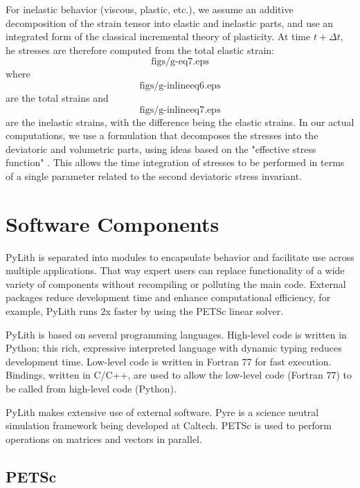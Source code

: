For inelastic behavior (viscous, plastic, etc.), we assume an additive
decomposition of the strain tensor into elastic and inelastic parts,
and use an integrated form of the classical incremental theory of
plasticity. At time $t+\Delta t$, he stresses are therefore computed
from the total elastic strain:
\begin{equation}
  \text{figs/g-eq7.eps}
\end{equation}
where
\begin{equation}
  \text{figs/g-inlineeq6.eps}
\end{equation}
are the total strains and
\begin{equation}
  \text{figs/g-inlineeq7.eps}
\end{equation}
are the inelastic strains, with the difference being the elastic
strains. In our actual computations, we use a formulation that
decomposes the stresses into the deviatoric and volumetric parts,
using ideas based on the "effective stress function"
\cite{Kojic:Bathe:1987}. This allows the time integration of stresses
to be performed in terms of a single parameter related to the second
deviatoric stress invariant.

\section{Software Components}

PyLith is separated into modules to encapsulate behavior and
facilitate use across multiple applications. That way expert users can
replace functionality of a wide variety of components without
recompiling or polluting the main code. External packages reduce
development time and enhance computational efficiency, for example,
PyLith runs 2x faster by using the PETSc linear solver.

PyLith is based on several programming languages. High-level code is
written in Python; this rich, expressive interpreted language with
dynamic typing reduces development time. Low-level code is written in
Fortran 77 for fast execution. Bindings, written in C/C++, are used to
allow the low-level code (Fortran 77) to be called from high-level
code (Python).

PyLith makes extensive use of external software. Pyre is a science
neutral simulation framework being developed at Caltech. PETSc is used
to perform operations on matrices and vectors in parallel.

\subsection{PETSc}

